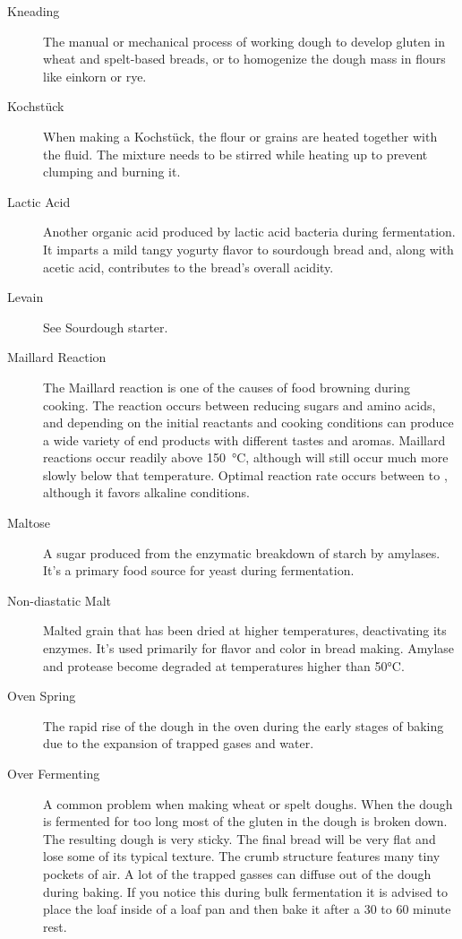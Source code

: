 \begin{description}
\item[Kneading] The manual or mechanical process of working dough to develop gluten
in wheat and spelt-based breads, or to homogenize the dough mass in flours like
einkorn or rye.

\item[Kochstück] When making a Kochstück, the flour or grains are heated
together with the fluid. The mixture needs to be stirred while heating up
to prevent clumping and burning it.

\item[Lactic Acid] Another organic acid produced by lactic acid bacteria during
fermentation. It imparts a mild tangy yogurty flavor to sourdough bread and, along
with acetic acid, contributes to the bread's overall acidity.

\item[Levain] See Sourdough starter.

\item[Maillard Reaction] The Maillard reaction is one of the causes of food browning
during cooking. The reaction occurs between reducing sugars and amino acids, and
depending on the initial reactants and cooking conditions can produce a wide variety
of end products with different tastes and aromas. Maillard reactions occur readily
above \SI{150}{\celsius}, although will still occur much more slowly below that
temperature. Optimal reaction rate occurs between  to ,
although it favors alkaline conditions.

\item[Maltose] A sugar produced from the enzymatic breakdown of starch by amylases.
It's a primary food source for yeast during fermentation.

\item[Non-diastatic Malt] Malted grain that has been dried at higher temperatures,
deactivating its enzymes. It's used primarily for flavor and color in bread making.
Amylase and protease become degraded at temperatures higher than 50°C.

\item[Oven Spring] The rapid rise of the dough in the oven during the early stages
of baking due to the expansion of trapped gases and water.

\item[Over Fermenting] A common problem when making wheat or spelt doughs. When the
dough is fermented for too long most of the gluten in the dough is broken down. The
resulting dough is very sticky. The final bread will be very flat and lose some of its
typical texture. The crumb structure features many tiny pockets of air. A lot of the
trapped gasses can diffuse out of the dough during baking. If you notice this during
bulk fermentation it is advised to place the loaf inside of a loaf pan and then bake
it after a 30 to 60 minute rest.


\end{description}
